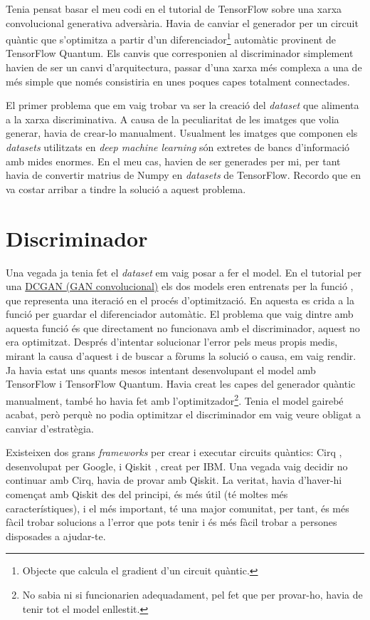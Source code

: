 Tenia pensat basar el meu codi en el tutorial de TensorFlow sobre una xarxa convolucional generativa adversària. Havia de canviar el generador per un circuit quàntic que s'optimitza a partir d'un diferenciador\footnote{Objecte que calcula el gradient d'un circuit quàntic.} automàtic provinent de TensorFlow Quantum. Els canvis que corresponien al discriminador simplement havien de ser un canvi d'arquitectura, passar d'una xarxa més complexa a una de més simple que només consistiria en unes poques capes totalment connectades.

El primer problema que em vaig trobar va ser la creació del \textit{dataset} que alimenta a la xarxa discriminativa. A causa de la peculiaritat de les imatges que volia generar, havia de crear-lo manualment. Usualment les imatges que componen els \textit{datasets} utilitzats en \textit{deep machine learning} són extretes de bancs d'informació amb mides enormes. En el meu cas, havien de ser generades per mi, per tant havia de convertir matrius de Numpy en \textit{datasets} de TensorFlow. Recordo que en va costar arribar a tindre la solució a aquest problema. 

\section{Discriminador}

Una vegada ja tenia fet el \textit{dataset} em vaig posar a fer el model. En el tutorial per una \href{https://www.tensorflow.org/tutorials/generative/dcgan}{DCGAN (GAN convolucional)} els dos models eren entrenats per la funció , que representa una iteració en el procés d'optimització. En aquesta es crida a la funció  per guardar el diferenciador automàtic. El problema que vaig dintre amb aquesta funció és que directament no funcionava amb el discriminador, aquest no era optimitzat. Després d'intentar solucionar l'error pels meus propis medis, mirant la causa d'aquest i de buscar a fòrums la solució o causa, em vaig rendir. Ja havia estat uns quants mesos intentant desenvolupant el model amb TensorFlow i TensorFlow Quantum. Havia creat les capes del generador quàntic manualment, també ho havia fet amb l'optimitzador\footnote{No sabia ni si funcionarien adequadament, pel fet que per provar-ho, havia de tenir tot el model enllestit.}. Tenia el model gairebé acabat, però perquè no podia optimitzar el discriminador em vaig veure obligat a canviar d'estratègia.

Existeixen dos grans \textit{frameworks} per crear i executar circuits quàntics: Cirq \cite{cirq}, desenvolupat per Google, i Qiskit \cite{qiskit}, creat per IBM. Una vegada vaig decidir no continuar amb Cirq, havia de provar amb Qiskit. La veritat, havia d'haver-hi començat amb Qiskit des del principi, és més útil (té moltes més característiques), i el més important, té una major comunitat, per tant, és més fàcil trobar solucions a l'error que pots tenir i és més fàcil trobar a persones disposades a ajudar-te.

